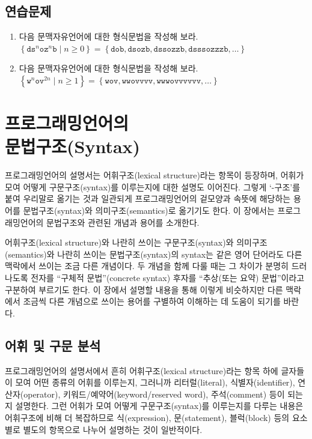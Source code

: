 \documentclass[b5paper,chapter,figtabcapt]{oblivoir}
\begin{document}
\section*{연습문제}
\begin{enumerate}
\item 다음 문맥자유언어에 대한 형식문법을 작성해 보라.\\
$\displaystyle
 \left\{ \mathtt{d}\mathtt{s}^n\mathtt{o}\mathtt{z}^n\mathtt{b}
           \mid
           n\ge0 \right\}
 =
 \left\{ \mathtt{dob}
       , \mathtt{dsozb}
       , \mathtt{dssozzb}
       , \mathtt{dsssozzzb}
       , \ldots \right\}$

\item 다음 문맥자유언어에 대한 형식문법을 작성해 보라.\\
$\displaystyle
 \left\{ \mathtt{w}^n\mathtt{o}\mathtt{v}^{2n}
           \mid
           n\ge1 \right\}
 =
 \left\{ \mathtt{wov}
       , \mathtt{wwovvvv}
       , \mathtt{wwwovvvvvv}
       , \ldots \right\}$
\end{enumerate}

\chapter[프로그래밍언어의 문법구조(Syntax)]{프로그래밍언어의\\문법구조(Syntax)}
프로그래밍언어의 설명서는 어휘구조(lexical structure)라는 항목이
등장하며, 어휘가 모여 어떻게 구문구조(syntax)를 이루는지에 대한
설명도 이어진다. 그렇게 `-구조'를 붙여 우리말로 옮기는 것과 일관되게
프로그래밍언어의 겉모양과 속뜻에 해당하는 용어를 문법구조(syntax)와
의미구조(semantics)로 옮기기도 한다. 이 장에서는 프로그래밍언어의
문법구조와 관련된 개념과 용어를 소개한다.

어휘구조(lexical structure)와 나란히 쓰이는 구문구조(syntax)와
의미구조(semantics)와 나란히 쓰이는 문법구조(syntax)의
syntax는 같은 영어 단어라도 다른 맥락에서 쓰이는 조금 다른 개념이다.
두 개념을 함께 다룰 때는 그 차이가 분명히 드러나도록
전자를 ``구체적 문법''(concrete syntax) 후자를
``추상(또는 요약) 문법''이라고 구분하여 부르기도 한다.
이 장에서 설명할 내용을 통해 이렇게 비슷하지만 다른 맥락에서
조금씩 다른 개념으로 쓰이는 용어를 구별하여 이해하는 데 도움이
되기를 바란다.

\newpage

\section{어휘 및 구문 분석}
\label{sec:LexParse}
프로그래밍언어의 설명서\cite{Swift5Ref,CSharp6Draft,JavaSE8spec,Haskell2010}에서
흔히 어휘구조(lexical structure)라는 항목 하에 글자들이 모여 어떤 종류의
어휘를 이루는지, 그러니까 리터럴(literal), 식별자(identifier), 연산자(operator),
키워드/예약어(keyword/reserved word), 주석(comment) 등이 되는지 설명한다.
그런 어휘가 모여 어떻게 구문구조(syntax)를 이루는지를 다루는 내용은
어휘구조에 비해 더 복잡하므로 식(expression), 문(statement), 블럭(block) 등의
요소별로 별도의 항목으로 나누어 설명하는 것이 일반적이다.
\end{document}
